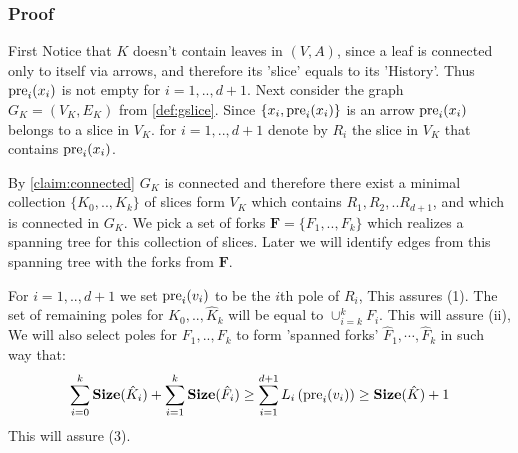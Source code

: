 \documentclass{beamer}
\begin{document}
\begin{frame}
  \frametitle{Proof} 

    First Notice that $K$ doesn't contain leaves in $(V,A)$, since a leaf is connected only to itself via arrows, and therefore its 'slice' equals to its 'History'. Thus $\text{pre}_{i}(x_{i})$ is not empty for $i=1,..,d+1$. Next consider the graph $G_{K}= (V_{K},E_{K})$ from \cref{def:gslice}. Since $\{ x_{i}, \text{pre}_{i}(x_{i}) \}$ is an arrow $\text{pre}_{i}(x_{i})$ belongs to a slice in $V_{K}$. for $i=1,..,d+1$ denote by $R_{i}$ the slice in $V_{K}$ that contains $\text{pre}_{i}(x_i)$. 

    By \cref{claim:connected} $G_{K}$ is connected and therefore there exist a minimal collection $\{K_{0},..,K_{k}\}$ of slices form $V_{K}$ which contains $R_{1},R_{2},..R_{d+1}$, and which is connected in $G_{K}$. We pick a set of forks $\mathbf{F} = \{F_{1},..,F_{k} \}$ which realizes a spanning tree for this collection of slices. Later we will identify edges from this spanning tree with the forks from $\mathbf{F}$.  

    For $i=1,..,d+1$ we set $\text{pre}_{i}(v_{i})$ to be the $i$th pole of $R_{i}$, This assures (1). The set of remaining poles for $\hat{K}_0, ..,\hat{K}_{k}$ will be equal to $\cup^{k}_{i=k}F_{i}$. This will assure (ii), We will also select poles for $F_{1}, ..,F_{k}$ to form 'spanned forks' $\hat{F}_{1}, \cdots,\hat{F}_{k}$ in such way that:  
    \begin{equation*}
      \begin{split}
        \sum^{k}_{i=0}\mathbf{Size}(\hat{K}_{i}) + \sum^{k}_{i=1}\mathbf{Size}(\hat{F}_{i}) \ge \sum_{i=1}^{d+1}L_{i}\left( \text{pre}_{i}(v_{i}) \right) \ge \mathbf{Size}(\hat{K}) + 1
      \end{split}
    \end{equation*}
    This will assure (3). 

  \end{frame}
\end{document}
